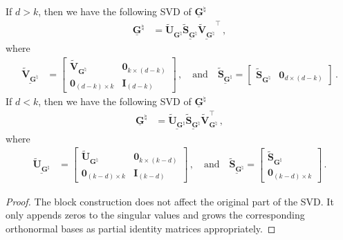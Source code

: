 \begin{lemma}
\label{zero-block-svd}
    If $d>k$, then we have the following SVD of $\underline{\mathbf{G}}^\natural$
    \begin{align*}
        \underline{\mathbf{G}}^\natural & = \widetilde{\bm U}_{\bm G^\natural} \underline{\widetilde{\bm S}_{\bm G^\natural}} \underline{\widetilde{\bm V}_{\bm G^\natural}}^{\!\top}\,,
    \end{align*}
    where
    \begin{align*}
        \underline{\widetilde{\bm V}_{\bm G^\natural}} & = \begin{bmatrix}
            \widetilde{\bm V}_{\bm G^\natural} & \bm 0_{k\times (d-k)}\\
            \bm 0_{(d-k) \times k} & \bm I_{(d-k)}
        \end{bmatrix}\,, \quad \text{and} \quad \underline{\widetilde{\bm S}_{\bm G^\natural}} = \begin{bmatrix}
       \widetilde{\bm S}_{\bm G^\natural} & \bm 0_{d\times (d-k)}
       \end{bmatrix}\,.
    \end{align*}
    If $d<k$, then we have the following SVD of $\underline{\mathbf{G}}^\natural$
    \begin{align*}
        \underline{\mathbf{G}}^\natural & = \underline{\widetilde{\bm U}_{\bm G^\natural}} \underline{\widetilde{\bm S}_{\bm G^\natural}} \widetilde{\bm V}_{\bm G^\natural}^{\!\top}\,,
    \end{align*}
    where
    \begin{align*}
        \underline{\widetilde{\bm U}_{\bm G^\natural}} & = \begin{bmatrix}
            \widetilde{\bm U}_{\bm G^\natural} & \bm 0_{k\times (k-d)}\\
            \bm 0_{(k-d) \times k} & \bm I_{(k-d)}
        \end{bmatrix}\,, \quad \text{and} \quad \underline{\widetilde{\bm S}_{\bm G^\natural}} = \begin{bmatrix}
       \widetilde{\bm S}_{\bm G^\natural} \\ \bm 0_{(k-d)\times k}
       \end{bmatrix}\,.
    \end{align*}
\end{lemma}
\begin{proof}
    The block construction does not affect the original part of the SVD. It only appends zeros to the singular values and grows the corresponding orthonormal bases as partial identity matrices appropriately.
\end{proof}
